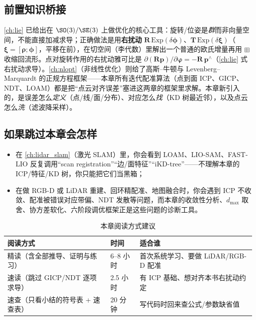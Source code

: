 \subsection*{前置知识桥接}
\cref{ch:lie} 已给出在 $\SO(3)/\SE(3)$ 上做优化的核心工具：旋转/位姿是\emph{群}而非向量空间，不能直接加减求导；正确做法是用\textbf{右扰动} $\mathbf{R}\,\mathrm{Exp}(\delta\boldsymbol{\phi})$、$\mathbf{T}\,\mathrm{Exp}(\delta\boldsymbol{\xi})$（$\boldsymbol{\xi}=[\boldsymbol{\rho};\boldsymbol{\phi}]$，平移在前），在切空间（李代数）里解出一个普通的欧氏增量再用 $\boxplus$ 收缩回流形。点对旋转作用的右扰动雅可比是 $\partial(\mathbf{R}\mathbf{p})/\partial\boldsymbol{\varphi}=-\mathbf{R}\,\mathbf{p}^\wedge$（\cref{ch:lie} 式右扰动求导）。\cref{ch:nlopt}（非线性优化）则给了高斯--牛顿与 Levenberg--Marquardt 的正规方程框架——本章所有迭代配准算法（点到面 ICP、GICP、NDT、LOAM）都是把“点云对齐误差”塞进这两章的框架里求解。本章新引入的，是误差怎么\emph{定义}（点/线/面/分布）、对应怎么\emph{找}（KD 树最近邻），以及点云怎么\emph{洗}（滤波降采样）。

\subsection*{如果跳过本章会怎样}
\begin{itemize}
  \item 在 \cref{ch:lidar_slam}（激光 SLAM）里，你会看到 LOAM、LIO-SAM、FAST-LIO 反复调用“scan registration”“边/面特征”“iKD-tree”——不理解本章的 ICP/特征/KD 树，你只能把它们当黑箱；
  \item 在做 RGB-D 或 LiDAR 重建、回环精配准、地图融合时，你会遇到 ICP 不收敛、配准被错误对应带偏、NDT 发散等问题，而本章的收敛性分析、$d_{\max}$ 取舍、协方差软化、六阶段调优框架正是这些问题的诊断工具。
\end{itemize}

\begin{table}[H]\centering\small
\caption{本章阅读方式建议}
\label{tab:pc-reading}
\begin{tabular}{lll}
\toprule
阅读方式 & 时间 & 适合谁 \\
\midrule
精读（含全部推导、证明与练习） & 6--8 小时 & 首次系统学习、要做 LiDAR/RGB-D 配准 \\
速读（跳过 GICP/NDT 逐项求导） & 2.5 小时 & 有 ICP 基础、想对齐本书右扰动约定 \\
速查（只看小结的符号表 + 速查表） & 20 分钟 & 写代码时回来查公式/参数缺省值 \\
\bottomrule
\end{tabular}
\end{table}

